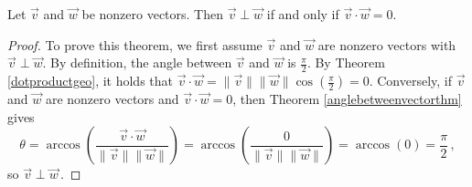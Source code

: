 \begin{theorem} \label{dotprodorththm} 
  Let $\vec{v}$ and $\vec{w}$ be nonzero vectors.  Then $\vec{v} \perp \vec{w}$ if and only if $\vec{v} \cdot \vec{w} = 0$.   

\end{theorem}

\ifcourse
\ifanalysis

\begin{proof}
To prove this theorem, we first assume $\vec{v}$ and $\vec{w}$ are nonzero vectors with  $\vec{v} \perp \vec{w}$.  By definition, the angle between $\vec{v}$ and $\vec{w}$ is $\frac{\pi}{2}$.  By Theorem \ref{dotproductgeo}, it holds that $\vec{v} \cdot \vec{w} = \| \vec{v} \| \| \vec{w} \| \cos\left(\frac{\pi}{2}\right) = 0$. Conversely, if $\vec{v}$ and $\vec{w}$ are nonzero vectors and $\vec{v} \cdot \vec{w} = 0$,  then Theorem \ref{anglebetweenvectorthm} gives 
$$\theta = \arccos\left( \frac{\vec{v} \cdot \vec{w}}{\| \vec{v} \| \|\vec{w} \|}\right) = \arccos\left( \frac{0}{\| \vec{v} \| \|\vec{w} \|}\right) = \arccos(0) = \frac{\pi}{2}\,,$$
so $\vec{v} \perp \vec{w}\,.$  
\end{proof}

\fi
\fi


